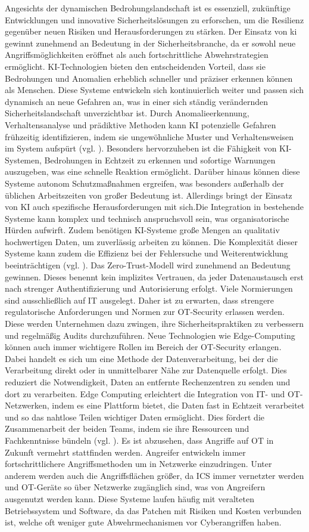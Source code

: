 Angesichts der dynamischen Bedrohungslandschaft ist es essenziell, zukünftige Entwicklungen und innovative Sicherheitslösungen zu erforschen, um die Resilienz gegenüber neuen Risiken und Herausforderungen zu stärken. Der Einsatz von \ac{ki} gewinnt zunehmend an Bedeutung in der Sicherheitsbranche, da er sowohl neue Angriffsmöglichkeiten eröffnet als auch fortschrittliche Abwehrstrategien ermöglicht. KI-Technologien bieten den entscheidenden Vorteil, dass sie Bedrohungen und Anomalien erheblich schneller und präziser erkennen können als Menschen. Diese Systeme entwickeln sich kontinuierlich weiter und passen sich dynamisch an neue Gefahren an, was in einer sich ständig verändernden Sicherheitslandschaft unverzichtbar ist. Durch Anomalieerkennung, Verhaltensanalyse und prädiktive Methoden kann KI potenzielle Gefahren frühzeitig identifizieren, indem sie ungewöhnliche Muster und Verhaltensweisen im System aufspürt (vgl. \cite{hornetsec}). Besonders hervorzuheben ist die Fähigkeit von KI-Systemen, Bedrohungen in Echtzeit zu erkennen und sofortige Warnungen auszugeben, was eine schnelle Reaktion ermöglicht. Darüber hinaus können diese Systeme autonom Schutzmaßnahmen ergreifen, was besonders außerhalb der üblichen Arbeitszeiten von großer Bedeutung ist. Allerdings bringt der Einsatz von KI auch spezifische Herausforderungen mit sich.\clearpage \noindent Die Integration in bestehende Systeme kann komplex und technisch anspruchsvoll sein, was organisatorische Hürden aufwirft. Zudem benötigen KI-Systeme große Mengen an qualitativ hochwertigen Daten, um zuverlässig arbeiten zu können. Die Komplexität dieser Systeme kann zudem die Effizienz bei der Fehlersuche und Weiterentwicklung beeinträchtigen (vgl. \cite{itPort}). Das Zero-Trust-Modell wird zunehmend an Bedeutung gewinnen. Dieses benennt kein implizites Vertrauen, da jeder Datenaustausch erst nach strenger Authentifizierung und Autorisierung erfolgt. Viele Normierungen sind ausschließlich auf IT ausgelegt. Daher ist zu erwarten, dass strengere regulatorische Anforderungen und Normen zur OT-Security erlassen werden. Diese werden Unternehmen dazu zwingen, ihre Sicherheitspraktiken zu verbessern und regelmäßig Audits durchzuführen. Neue Technologien wie Edge-Computing können auch immer wichtigere Rollen im Bereich der OT-Security erlangen. Dabei handelt es sich um eine Methode der Datenverarbeitung, bei der die Verarbeitung direkt oder in unmittelbarer Nähe zur Datenquelle erfolgt. Dies reduziert die Notwendigkeit, Daten an entfernte Rechenzentren zu senden und dort zu verarbeiten. Edge Computing erleichtert die Integration von IT- und OT-Netzwerken, indem es eine Plattform bietet, die Daten fast in Echtzeit verarbeitet und so das nahtlose Teilen wichtiger Daten ermöglicht. Dies fördert die Zusammenarbeit der beiden Teams, indem sie ihre Ressourcen und Fachkenntnisse bündeln (vgl. \cite{stratus}). Es ist abzusehen, dass Angriffe auf OT in Zukunft vermehrt stattfinden werden. Angreifer entwickeln immer fortschrittlichere Angriffsmethoden um in Netzwerke einzudringen. Unter anderem werden auch die Angriffsflächen größer, da ICS immer vernetzter werden und OT-Geräte so über Netzwerke zugänglich sind, was von Angreifern ausgenutzt werden kann. Diese Systeme laufen häufig mit veralteten Betriebssystem und Software, da das Patchen mit Risiken und Kosten verbunden ist, welche oft weniger gute Abwehrmechanismen vor Cyberangriffen haben. 

